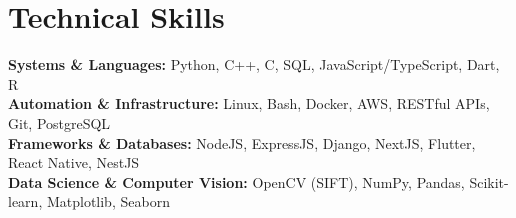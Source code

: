 \medskip

\resumeItemListStart
{}
\resumeItemListEnd
\resumeItemListEnd

\resumeSubHeadingListEnd

\section{Technical Skills}
\begin{itemize}[leftmargin=0.15in, label={}]
  \small{\item{
        \textbf{Systems \& Languages:} {Python, C++, C, SQL, JavaScript/TypeScript, Dart, R} \\
        \textbf{Automation \& Infrastructure:} {Linux, Bash, Docker, AWS, RESTful APIs, Git, PostgreSQL} \\
        \textbf{Frameworks \& Databases:} {NodeJS, ExpressJS, Django, NextJS, Flutter, React Native, NestJS} \\
        \textbf{Data Science \& Computer Vision:} {OpenCV (SIFT), NumPy, Pandas, Scikit-learn, Matplotlib, Seaborn} \\
        }}
\end{itemize}

